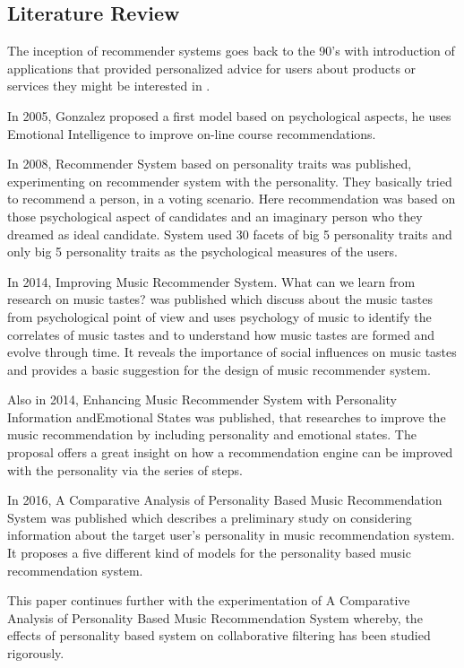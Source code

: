 \documentclass[conference]{IEEEtran}
\begin{document}
\subsection{Literature Review}
The inception of recommender systems goes back to the 90's with introduction of applications that provided personalized advice for users about products or services they might be interested in \cite{resnick}.

In 2005, Gonzalez \cite{gonzalez} proposed a first model based on psychological aspects, he uses Emotional Intelligence to improve on-line course recommendations.

In 2008, Recommender System based on personality traits \cite{nunes} was published, experimenting on recommender system with the personality. They basically tried to recommend a person, in a voting scenario. Here recommendation was based on those psychological aspect of candidates and an imaginary person who they dreamed as ideal candidate. System used 30 facets of big 5 personality traits and only big 5 personality traits as the psychological measures of the users.

In 2014, Improving Music Recommender System. What can we learn from research on music tastes? \cite{laplante} was published which discuss about the music tastes from psychological point of view and uses psychology of music to identify the correlates of music tastes and to understand how music tastes are formed and evolve through time. It reveals the importance of social influences on music tastes and provides a basic suggestion for the design of music recommender system.

Also in 2014, Enhancing Music Recommender System with Personality Information andEmotional States \cite{bruce} was published, that researches to improve the music recommendation by including personality and emotional states. The proposal offers a great insight on how a recommendation engine can be improved with the personality via the series of steps.

In 2016, A Comparative Analysis of Personality Based Music Recommendation System \cite{melissa} was published which describes a preliminary study on considering information about the target user's personality in music recommendation system. It proposes a five different kind of models for the personality based music recommendation system.

This paper continues further with the experimentation of A Comparative Analysis of Personality Based Music Recommendation System whereby, the effects of personality based system on collaborative filtering has been studied rigorously.
\end{document}
